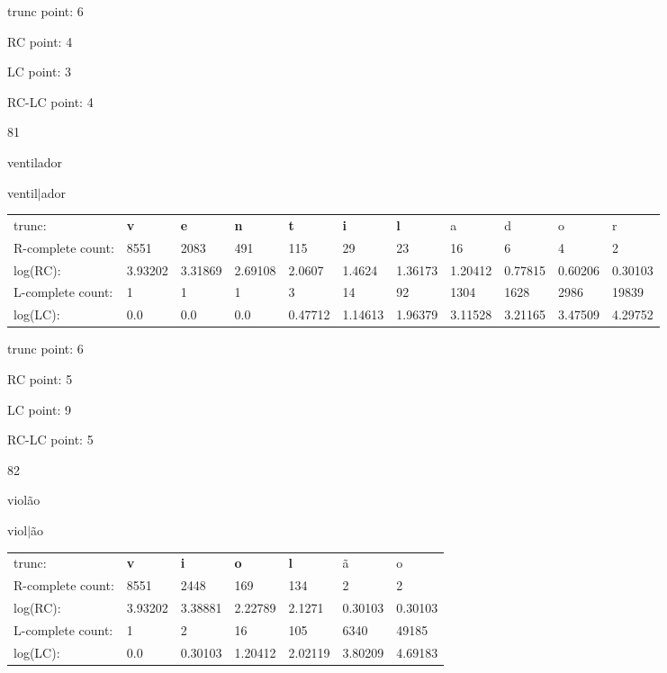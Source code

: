 \documentclass{article}
\begin{document}
trunc point: 6

RC point: 4

LC point: 3

RC-LC point: 4

\vspace{3em}



81

ventilador

ventil$|$ador

\vspace{1em}

\begin{tabular}{l|llllllllll}

trunc: & {\color{red}\bf v} & {\color{red}\bf e} & {\color{red}\bf n} & {\color{red}\bf t} & {\color{red}\bf i} & {\color{red}\bf l} & a & d & o & r \\ 
R-complete count: & 8551 & 2083 & 491 & 115 & 29 & 23 & 16 & 6 & 4 & 2 \\ 
log(RC): & 3.93202 & 3.31869 & 2.69108 & 2.0607 & 1.4624 & 1.36173 & 1.20412 & 0.77815 & 0.60206 & 0.30103 \\ 
L-complete count: & 1 & 1 & 1 & 3 & 14 & 92 & 1304 & 1628 & 2986 & 19839 \\ 
log(LC): & 0.0 & 0.0 & 0.0 & 0.47712 & 1.14613 & 1.96379 & 3.11528 & 3.21165 & 3.47509 & 4.29752 \\ 
\end{tabular}

trunc point: 6

RC point: 5

LC point: 9

RC-LC point: 5

\vspace{3em}



82

violão

viol$|$ão

\vspace{1em}

\begin{tabular}{l|llllll}

trunc: & {\color{red}\bf v} & {\color{red}\bf i} & {\color{red}\bf o} & {\color{red}\bf l} & ã & o \\ 
R-complete count: & 8551 & 2448 & 169 & 134 & 2 & 2 \\ 
log(RC): & 3.93202 & 3.38881 & 2.22789 & 2.1271 & 0.30103 & 0.30103 \\ 
L-complete count: & 1 & 2 & 16 & 105 & 6340 & 49185 \\ 
log(LC): & 0.0 & 0.30103 & 1.20412 & 2.02119 & 3.80209 & 4.69183 \\ 
\end{tabular}
\end{document}
